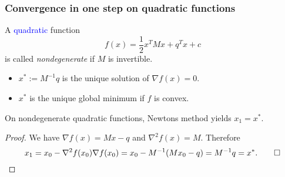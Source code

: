 \documentclass[aspectratio=149]{beamer}
\begin{document}
\begin{frame}
  \frametitle{Convergence in one step on quadratic functions}
  A \textcolor{blue}{quadratic} function
  \begin{equation}
    f(x) = \frac12 x^T M x + q^T x + c
  \end{equation}
  is called \textit{nondegenerate} if $M$ is invertible.
  \begin{itemize}
    \item $x^* := M^{-1}q$ is the unique solution of $\nabla f(x) = 0$.
    \item $x^*$ is the unique global minimum if $f$ is convex.
  \end{itemize}
  \begin{lemma}[\textcolor{gray}{arbitrary $x_0$}]%
    On nondegenerate quadratic functions, Newtons method yields $x_1=x^*$.
  \end{lemma}
  \begin{proof}
    We have $\nabla f(x) = Mx -q$ and $\nabla^2 f(x) = M$. Therefore
    \begin{equation}
      x_1 = x_0 - \nabla^2 f(x_0) \nabla f(x_0) = x_0 - M^{-1}(M x_0 - q) = M^{-1}q = x^*. \qed\qedhere
    \end{equation}
  \end{proof}
\end{frame}


\end{document}
